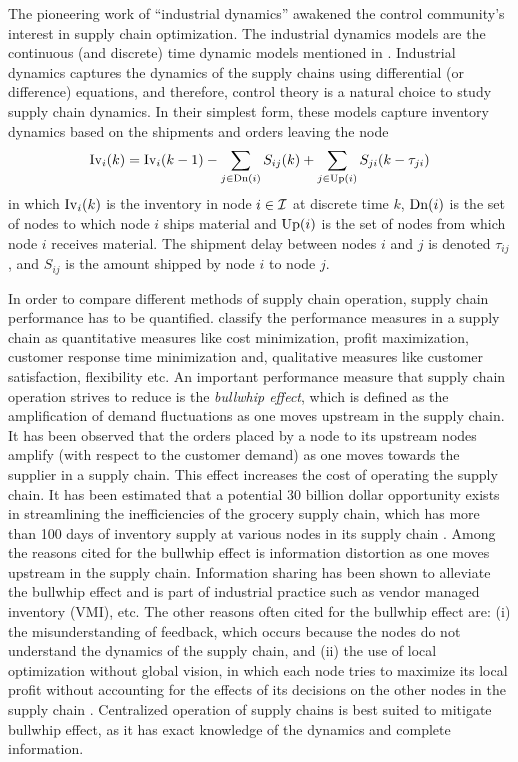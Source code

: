 The pioneering work of
``industrial dynamics'' awakened the 
control community's interest in supply chain optimization. The
industrial dynamics models are the continuous (and discrete) time
dynamic models mentioned in \citep{angerhofer:angelides:2000}.
Industrial dynamics captures the dynamics of the supply chains using
differential (or difference) equations, and therefore, control theory is a
natural choice to study supply chain dynamics. In their simplest form,
these models capture inventory  dynamics based on the shipments and
orders leaving the node 
\begin{equation*}
\textrm{Iv}_i(k) = \textrm{Iv}_i(k-1) - \sum_{j \in \textrm{Dn}(i)}S_{ij}(k) + \sum_{j \in
  \textrm{Up}(i)}S_{ji}(k-\tau_{ji}) 
\end{equation*}
in which $\textrm{Iv}_i(k)$ is the inventory in node $i \in \mathcal{I}$ at
discrete time $k$, $\textrm{Dn}(i)$ is the set of nodes to which node $i$
ships material and $\textrm{Up}(i)$ is the set of nodes from which node $i$
receives material. The shipment delay between  nodes $i$ and $j$ is
denoted $\tau_{ij}$, and $S_{ij}$ is the amount shipped by node $i$ to
node $j$. 

In order to compare different methods of supply chain operation,
supply chain performance has to be quantified.  
\citet{beamon:1999,beamon:1998} classify the performance measures in a
supply chain as quantitative measures like cost minimization, profit
maximization, customer response time minimization and, qualitative
measures like customer satisfaction, flexibility etc. An important
performance measure that   
supply chain operation  strives to reduce is the \textit{bullwhip
  effect}, which is defined as the amplification of demand
fluctuations as one moves upstream in the supply chain. It has been
observed that the orders placed by a node to its upstream nodes
amplify (with respect to the customer demand) as one moves towards
the supplier in a supply chain. This effect increases the cost of
operating the supply chain. It has been estimated that a potential 
30 billion dollar opportunity exists in streamlining the inefficiencies of
the grocery supply chain, which has more than 100 days of inventory
supply at various nodes in its supply chain
\citep{lee:padmanabhan:whang:1997,lee:padmanabhan:whang:1997b}. Among
the reasons cited for 
the bullwhip effect is information distortion as one moves
upstream in the supply chain. Information sharing has been shown to
alleviate the bullwhip effect and is part of industrial practice such as
vendor managed inventory (VMI), etc. The other reasons often cited for
the bullwhip effect are: (i) the misunderstanding of feedback, which occurs
because the nodes do not understand the dynamics of the supply chain,
and (ii) the use of local optimization without global vision, in which each
node tries to maximize its local profit without accounting for the effects
of its decisions on the other nodes in the supply chain
\citep{moyaux:chaib-draa:damours:2007}. Centralized operation of
supply chains is best suited to mitigate bullwhip effect, as it has
exact knowledge  of the dynamics and complete information. 
 

